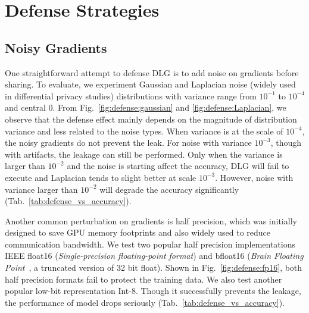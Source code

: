 \section{Defense Strategies} \label{sec:defense}


\subsection{Noisy Gradients} \label{sec:defense:noisy}
One straightforward attempt to defense DLG is to add noise on gradients before sharing. 
% 
% 
To evaluate, we experiment  Gaussian and Laplacian noise (widely used in differential privacy studies) distributions with variance range from $10^{-1}$ to $10^{-4}$ and central $0$. From Fig.~\ref{fig:defense:gaussian} and \ref{fig:defense:Laplacian}, we observe that the defense effect mainly depends on the magnitude of distribution variance and less related to the noise types. When variance is at the scale of $10^{-4}$, the noisy gradients do not prevent the leak. For noise with variance $10^{-3}$, though with artifacts, the leakage can still be performed. Only when the variance is larger than $10^{-2}$ and the noise is starting affect the accuracy, DLG will fail to execute and Laplacian tends to slight better at scale $10^{-3}$. However, noise with variance larger than $10^{-2}$ will degrade the accuracy significantly (Tab.~\ref{tab:defense_vs_accuracy}).

Another common perturbation on gradients is half precision, which was initially designed to save GPU memory footprints and also widely used to reduce communication bandwidth. We test two popular half precision implementations IEEE float16 (\textit{Single-precision floating-point format}) and bfloat16 (\textit{Brain Floating Point}~\cite{tagliavini2017transprecision}, a truncated version of 32 bit float). Shown in Fig.~\ref{fig:defense:fp16},  both half precision formats fail to protect the training data. We also test another popular low-bit representation Int-8. Though it successfully prevents the leakage, the performance of model drops seriously (Tab.~\ref{tab:defense_vs_accuracy}).

